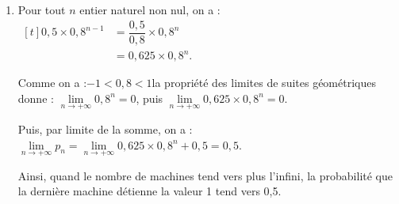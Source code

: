 \documentclass[10pt]{article}
\providecommand{\N}{\mathbb{N}}
\begin{document}
\begin{enumerate}
\begin{enumerate}
et, par ailleurs, on a :\quad $0,5 \times 0,8^{1 - 1} + 0,5 = 0,5 + 0,5 = 1$.

On constate donc que l'affirmation $P_1$ est vraie.

\textbf{Hérédité :} soit $n$ naturel non nul donné tel que l'affirmation $P_n$ est vraie.

D'après l'hypothèse de récurrence :

$\begin{aligned}
p_n = 0,5 \times 0,8^{n-1} + 0,5
	&\implies 0,8p_n = 0,8\left(0,5 \times 0,8^{n-1} + 0,5\right) \\
	&\implies 0,8p_n = 0,5 \times 0,8^{n-1} \times 0,8 + 0,4 \\
	&\implies 0,8p_n = 0,5 \times 0,8^{n} + 0,4 \\
	&\implies 0,8p_n + 0,1 = 0,5 \times 0,8^{n} + 0,4 + 0,1\\
	&\implies 0,8p_n + 0,1 = 0,5 \times 0,8^{n} + 0,5\\
	&\implies p_{n+1} = 0,5 \times 0,8^{n} + 0,5\quad \text{c'est }P_{n+1}\\
\end{aligned}$

\textbf{Conclusion :} on a prouvé que l'affirmation $P_1$ est vraie, et que, $n$ étant un naturel non nul, la véracité de $P_n$ entraîne celle de $P_{n+1}$. En vertu du principe de récurrence, on peut conclure que :

$\forall n \in \N^{*},\quad u_n = 0,5 \times 0,8^{n-1} + 0,5$.

Autrement dit, on a établi par récurrence une expression explicite du terme général $p_n$.

		\item Pour tout $n$ entier naturel non nul, on a : \quad $\begin{aligned}[t]
			0,5 \times 0,8^{n-1} &= \dfrac{0,5}{0,8} \times 0,8^{n} \\&= 0,625 \times 0,8^n.
		\end{aligned}$

		Comme on a :\quad $-1 < 0,8 < 1$\quad la propriété des limites de suites géométriques donne : \quad $\lim\limits_{n \to +\infty} 0,8^n = 0$, puis $\lim\limits_{n \to +\infty} 0,625 \times 0,8^n = 0$.

Puis, par limite de la somme, on a :\quad $\lim\limits_{n \to +\infty} p_n = \lim\limits_{n \to +\infty} 0,625 \times 0,8^n + 0,5 = 0,5$.

Ainsi, quand le nombre de machines tend vers plus l'infini, la probabilité que la dernière machine détienne la valeur 1 tend vers 0,5.
	\end{enumerate}
\end{enumerate}
\end{document}
